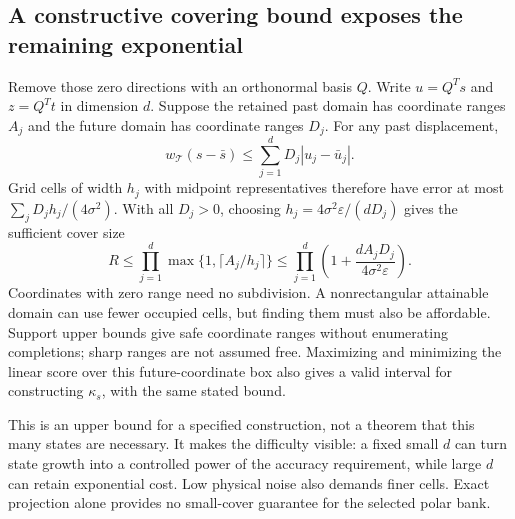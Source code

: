 \documentclass[10pt,a4paper]{article}
\begin{document}
\subsection{A constructive covering bound exposes the remaining exponential}
Remove those zero directions with an orthonormal basis $Q$. Write $u=Q^Ts$ and $z=Q^Tt$ in dimension $d$.
Suppose the retained past domain has coordinate ranges $A_j$ and the future domain has coordinate ranges
$D_j$. For any past displacement,
\[
 w_{\mathcal T}(s-\bar s)\leq\sum_{j=1}^d D_j|u_j-\bar u_j|.
\]
Grid cells of width $h_j$ with midpoint representatives therefore have error at most
$\sum_jD_jh_j/(4\sigma^2)$. With all $D_j>0$, choosing
$h_j=4\sigma^2\varepsilon/(dD_j)$ gives the sufficient cover size
\begin{equation}
 R\leq\prod_{j=1}^d\max\{1,\lceil A_j/h_j\rceil\}
 \leq\prod_{j=1}^d\left(1+\frac{dA_jD_j}{4\sigma^2\varepsilon}\right).
 \label{eq:cover-size}
\end{equation}
Coordinates with zero range need no subdivision. A nonrectangular attainable domain can use fewer occupied
cells, but finding them must also be affordable. Support upper bounds give safe coordinate ranges without
enumerating completions; sharp ranges are not assumed free. Maximizing and minimizing the linear score over
this future-coordinate box also gives a valid interval for constructing $\kappa_s$, with the same stated bound.

This is an upper bound for a specified construction, not a theorem that this many states are necessary.
It makes the difficulty visible: a fixed small $d$ can turn state growth into a controlled power of the
accuracy requirement, while large $d$ can retain exponential cost. Low physical noise also demands finer
cells. Exact projection alone provides no small-cover guarantee for the selected polar bank.
\end{document}
